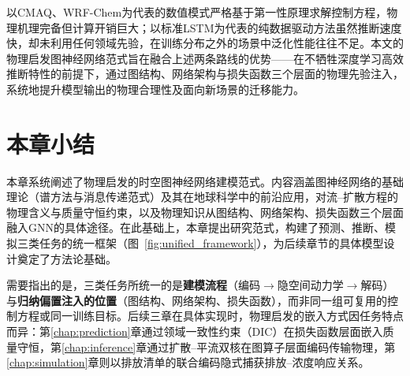 以CMAQ、WRF-Chem为代表的数值模式严格基于第一性原理求解控制方程，物理机理完备但计算开销巨大；以标准LSTM为代表的纯数据驱动方法虽然推断速度快，却未利用任何领域先验，在训练分布之外的场景中泛化性能往往不足。本文的物理启发图神经网络范式旨在融合上述两条路线的优势——在不牺牲深度学习高效推断特性的前提下，通过图结构、网络架构与损失函数三个层面的物理先验注入，系统地提升模型输出的物理合理性及面向新场景的迁移能力。


\section{本章小结}
\label{sec:method_summary}

本章系统阐述了物理启发的时空图神经网络建模范式。内容涵盖图神经网络的基础理论（谱方法与消息传递范式）及其在地球科学中的前沿应用，对流--扩散方程的物理含义与质量守恒约束，以及物理知识从图结构、网络架构、损失函数三个层面融入GNN的具体途径。在此基础上，本章提出研究范式，构建了预测、推断、模拟三类任务的统一框架（图~\ref{fig:unified_framework}），为后续章节的具体模型设计奠定了方法论基础。

需要指出的是，三类任务所统一的是\textbf{建模流程}（编码$\rightarrow$隐空间动力学$\rightarrow$解码）与\textbf{归纳偏置注入的位置}（图结构、网络架构、损失函数），而非同一组可复用的控制方程或同一训练目标。后续三章在具体实现时，物理启发的嵌入方式因任务特点而异：第\ref{chap:prediction}章通过领域一致性约束（DIC）在损失函数层面嵌入质量守恒，第\ref{chap:inference}章通过扩散--平流双核在图算子层面编码传输物理，第\ref{chap:simulation}章则以排放清单的联合编码隐式捕获排放--浓度响应关系。
